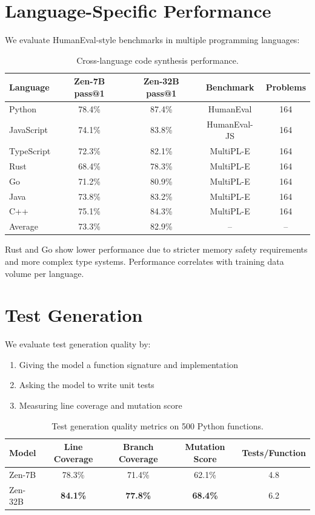 \documentclass[11pt,a4paper]{article}
\begin{document}
\section{Language-Specific Performance}

We evaluate HumanEval-style benchmarks in multiple programming languages:

\begin{table}[H]
\centering
\begin{tabular}{lcccc}
\toprule
\textbf{Language} & \textbf{Zen-7B pass@1} & \textbf{Zen-32B pass@1} & \textbf{Benchmark} & \textbf{Problems} \\
\midrule
Python & 78.4\% & 87.4\% & HumanEval & 164 \\
JavaScript & 74.1\% & 83.8\% & HumanEval-JS & 164 \\
TypeScript & 72.3\% & 82.1\% & MultiPL-E & 164 \\
Rust & 68.4\% & 78.3\% & MultiPL-E & 164 \\
Go & 71.2\% & 80.9\% & MultiPL-E & 164 \\
Java & 73.8\% & 83.2\% & MultiPL-E & 164 \\
C++ & 75.1\% & 84.3\% & MultiPL-E & 164 \\
\midrule
Average & 73.3\% & 82.9\% & -- & -- \\
\bottomrule
\end{tabular}
\caption{Cross-language code synthesis performance.}
\end{table}

Rust and Go show lower performance due to stricter memory safety requirements and
more complex type systems. Performance correlates with training data volume per language.

\section{Test Generation}

We evaluate test generation quality by:
\begin{enumerate}
  \item Giving the model a function signature and implementation
  \item Asking the model to write unit tests
  \item Measuring line coverage and mutation score
\end{enumerate}

\begin{table}[H]
\centering
\begin{tabular}{lcccc}
\toprule
\textbf{Model} & \textbf{Line Coverage} & \textbf{Branch Coverage} & \textbf{Mutation Score} & \textbf{Tests/Function} \\
\midrule
Zen-7B & 78.3\% & 71.4\% & 62.1\% & 4.8 \\
Zen-32B & \textbf{84.1\%} & \textbf{77.8\%} & \textbf{68.4\%} & 6.2 \\
\bottomrule
\end{tabular}
\caption{Test generation quality metrics on 500 Python functions.}
\end{table}
\end{document}
